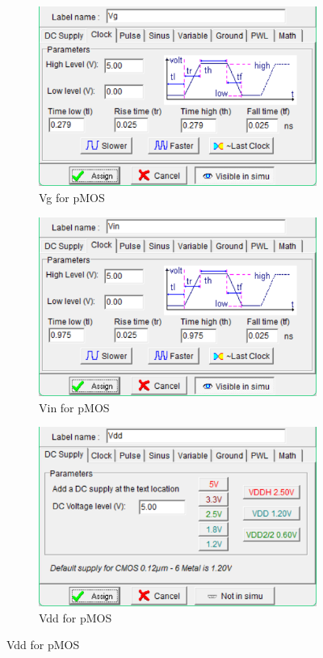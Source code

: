 \documentclass[a4paper,12pt]{article}
\begin{document}
\begin{figure}[H]
		\begin{subfigure}[t]{0.32\textwidth}
			\centering
			\includegraphics[width=1\textwidth, height=0.13\textheight]{Images/pmos/pspec1.2.png}
			\caption{Vg for pMOS}
			\label{fig:3-c}
		\end{subfigure}
		\hfill
		\begin{subfigure}[t]{0.32\textwidth}
			\centering
			\includegraphics[width=1\textwidth, height=0.13\textheight]{Images/pmos/pspec2.2.png}
			\caption{Vin for pMOS}
			\label{fig:3-d}
		\end{subfigure}
		\hfill
		\begin{subfigure}[t]{0.32\textwidth}
			\centering
			\includegraphics[width=1\textwidth, height=0.13\textheight]{Images/pmos/pspec4.png}
			\caption{Vdd for pMOS}
			\label{fig:3-e}
		\end{subfigure}
		

\end{figure}
\end{document}
